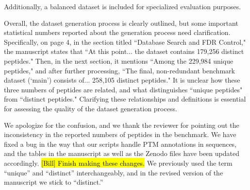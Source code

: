 \documentclass{article}
\newcommand{\response}[1]{\vspace*{1ex} \color{blue} \noindent #1 \color{black}
	\vspace*{2ex}}
\newcommand{\fixme}[1]{\hl{#1}}
\begin{document}
Additionally, a balanced dataset is included for specialized evaluation purposes.

Overall, the dataset generation process is clearly outlined, but some important statistical numbers reported about the generation process need clarification. Specifically, on page 4, in the section titled ``Database Search and FDR Control," the manuscript states that ``At this point... the dataset contains 179,256 distinct peptides." Then, in the next section, it mentions ``Among the 229,984 unique peptides," and after further processing, ``The final, non-redundant benchmark dataset (`main') consists of... 258,105 distinct peptides." It is unclear how these three numbers of peptides are related, and what distinguishes ``unique peptides" from ``distinct peptides." Clarifying these relationships and definitions is essential for assessing the quality of the dataset generation process.

\response{We apologize for the confusion, and we thank the reviewer for pointing out the inconsistency in the reported numbers of peptides in the benchmark.
  We have fixed a bug in the way that our scripts handle PTM annotations in sequences, and the tables in the manuscript as well as the Zenodo files have been updated accordingly.
  \fixme{[Bill] Finish making these changes.}
  We previously used the term ``unique'' and ``distinct'' interchangeably, and in the revised version of the manuscript we stick to ``distinct.''
}



\end{document}
